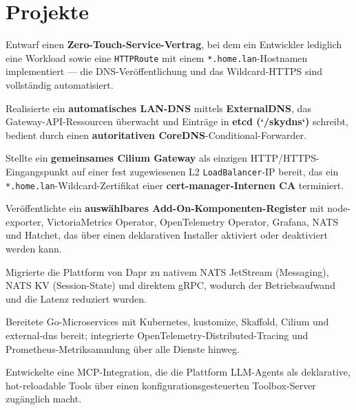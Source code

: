 \documentclass[10pt,a4paper]{resume}
\begin{document}
\vspace{2pt}

\section{Projekte}

\bullets
  \item Entwarf einen \textbf{Zero-Touch-Service-Vertrag}, bei dem ein Entwickler lediglich eine Workload sowie eine \texttt{HTTPRoute} mit einem \texttt{*.home.lan}-Hostnamen implementiert — die DNS-Veröffentlichung und das Wildcard-HTTPS sind vollständig automatisiert.
  \item Realisierte ein \textbf{automatisches LAN-DNS} mittels \textbf{ExternalDNS}, das Gateway-API-Ressourcen überwacht und Einträge in \textbf{etcd (`/skydns`)} schreibt, bedient durch einen \textbf{autoritativen CoreDNS}-Conditional-Forwarder.
  \item Stellte ein \textbf{gemeinsames Cilium Gateway} als einzigen HTTP/HTTPS-Eingangspunkt auf einer fest zugewiesenen L2 \texttt{LoadBalancer}-IP bereit, das ein \texttt{*.home.lan}-Wildcard-Zertifikat einer \textbf{cert-manager-Internen CA} terminiert.
  \item Veröffentlichte ein \textbf{auswählbares Add-On-Komponenten-Register} mit node-exporter, VictoriaMetrics Operator, OpenTelemetry Operator, Grafana, NATS und Hatchet, das über einen deklarativen Installer aktiviert oder deaktiviert werden kann.
\bulletsend
\vspace{1.0pt}
\bullets
  \item Migrierte die Plattform von Dapr zu nativem NATS JetStream (Messaging), NATS KV (Session-State) und direktem gRPC, wodurch der Betriebsaufwand und die Latenz reduziert wurden.
  \item Bereitete Go-Microservices mit Kubernetes, kustomize, Skaffold, Cilium und external-dns bereit; integrierte OpenTelemetry-Distributed-Tracing und Prometheus-Metriksammlung über alle Dienste hinweg.
  \item Entwickelte eine MCP-Integration, die die Plattform LLM-Agents als deklarative, hot-reloadable Tools über einen konfigurationsgesteuerten Toolbox-Server zugänglich macht.
\bulletsend
\end{document}
